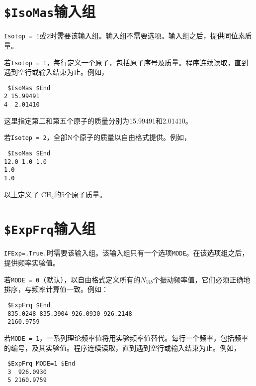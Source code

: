 \documentclass[12pt,a4paper,openany,twoside,cap]{ctexbook}
\begin{document}
\section{\texttt{\$IsoMas}输入组} \label{sec:inp-isomas}

\verb|Isotop = 1|或\verb|2|时需要该输入组。输入组不需要选项。输入组之后，提供同位素质量。

\bigskip{}
若\verb|Isotop = 1|，每行定义一个原子，包括原子序号及质量。程序连续读取，直到遇到空行或输入结束为止。例如，
\begin{colorboxed}[oval=false,boxcolor=green!75!black,bgcolor=green!5!white]
\ttfamily
\begin{lstlisting}
 $IsoMas $End
2 15.99491
4  2.01410
\end{lstlisting}\end{colorboxed}
这里指定第二和第五个原子的质量分别为15.99491和2.01410。

\bigskip{}
若\verb|Isotop = 2|，全部N个原子的质量以自由格式提供。例如，
\begin{colorboxed}[oval=false,boxcolor=green!75!black,bgcolor=green!5!white]
\ttfamily
\begin{lstlisting}
 $IsoMas $End
12.0 1.0 1.0
1.0
1.0
\end{lstlisting}\end{colorboxed}
以上定义了 CH$_4$的5个原子质量。

\section{\texttt{\$ExpFrq}输入组} \label{sec:inp-expfrq}

\verb|IFExp=.True.|时需要该输入组。该输入组只有一个选项\verb|MODE|。在该选项组之后，提供频率实验值。

\bigskip{}
若\verb|MODE = 0|（默认），以自由格式定义所有的$N_{Vib}$个振动频率值，它们必须正确地排序，与频率计算值一致。例如：
\begin{colorboxed}[oval=false,boxcolor=green!75!black,bgcolor=green!5!white]
\ttfamily
\begin{lstlisting}
 $ExpFrq $End
 835.0248 835.3904 926.0930 926.2148
 2160.9759
\end{lstlisting}\end{colorboxed}


若\verb|MODE = 1|，一系列理论频率值将用实验频率值替代。每行一个频率，包括频率的编号，及其实验值。程序连续读取，直到遇到空行或输入结束为止。例如，
\begin{colorboxed}[oval=false,boxcolor=green!75!black,bgcolor=green!5!white]
\ttfamily
\begin{lstlisting}
 $ExpFrq MODE=1 $End
 3  926.0930
 5 2160.9759
\end{lstlisting}\end{colorboxed}
\end{document}
